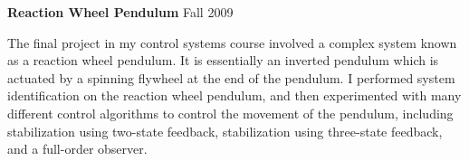 \textbf{Reaction Wheel Pendulum} \hfill Fall 2009
\begin{description}
\item The final project in my control systems course involved a complex
system known as a reaction wheel pendulum.  It is essentially an inverted
pendulum which is actuated by a spinning flywheel at the end of the
pendulum. I performed system identification on the reaction wheel pendulum,
and then experimented with many different control algorithms to control
the movement of the pendulum, including stabilization using two-state
feedback, stabilization using three-state feedback, and a full-order
observer.
\end{description}
